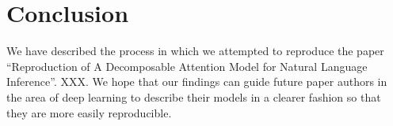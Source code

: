 \documentclass{article}
\begin{document}
\section{Conclusion}
We have described the process in which we attempted to reproduce the paper ``Reproduction of A Decomposable Attention Model for Natural Language Inference''. XXX. We hope that our findings can guide future paper authors in the area of deep learning to describe their models in a clearer fashion so that they are more easily reproducible.

{}

\end{document}

